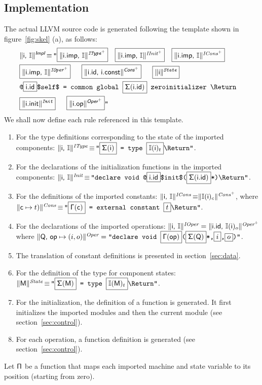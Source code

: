 \documentclass{llncs}
\newcommand{\trad}[2]{\ensuremath{\lVert \textsf{#1} \rVert^{\textit{#2}}}}
\newcommand{\nl}[0]{\text{\Return}}
\DeclareMathOperator{\isdef}{\equiv}
\newcommand{\llvm}[1]{\texttt{#1}}
\newcommand{\B}[1]{\textsf{#1}}
\newcommand{\ListOf}[1]{$\mbox{#1}^+$}
\newcommand{\PH}[1]{\framebox{$#1$}}
\newcommand{\intf}[0]{\ensuremath{\mathbb{I}}}
\newcommand{\Global}[0]{\ensuremath{\sf\Gamma}}
\newcommand{\idx}[0]{\ensuremath{\sf\Pi}}
\newcommand{\state}[0]{\ensuremath{\sf\Sigma}}
\begin{document}
\subsection{Implementation}

The actual LLVM source code is generated following the template shown in
figure~\ref{fig:skel} (a), as follows:
\begin{align*}
  \lefteqn{\trad{\B{i}, \intf}{\B{Impl}} \isdef
  \llvm{"\PH{\trad{\B{i.imp}, \intf}{\ListOf{IType}}}} 
  \quad \PH{\trad{\B{i.imp}, \intf}{\ListOf{IInit}}}
  \quad \PH{\trad{\B{i.imp}, \intf}{\ListOf{ICons}}}} \\
& \llvm{\PH{\trad{\B{i.imp}, \intf}{\ListOf{IOper}}}
  \quad \PH{\trad{\B{i.id}, \B{i.const}}{\ListOf{\B{Cons}}}}
  \quad \PH{\trad{\B{i}}{State}}} \\
& \llvm{@\PH{\B{i.id}}\$self\$ = common global \PH{\state(\B{i.id})} zeroinitializer \nl} \\
& \llvm{\PH{\trad{\B{i.init}}{Init}} 
  \quad \PH{\trad{\B{i.op}}{\ListOf{\B{Oper}}}}"}
\end{align*}
We shall now define each rule referenced in this template.
\begin{enumerate}
\item For the type definitions corresponding to the state of the imported
  components: $\trad{i, \intf}{IType} \isdef \llvm{"\PH{\state(\B{i})} =
    type \PH{\intf(\B{i})_t}\nl"}$.
\item For the declarations of the initialization functions in the imported
  components: $\trad{\B{i}, \intf}{Init} \isdef \llvm{"declare void
    @\PH{\B{i.id}}\$init\$(\PH{\state(\B{i.id})}*)\nl"}$.
\item For the definitions of the imported constants: $\trad{\B{i}, \intf}{ICons}
  \isdef \trad{$\intf(\B{i})_c$}{\ListOf{Cons}}$, where
  \noindent $\trad{$\B{c} \mapsto t)$}{Cons} \isdef \llvm{"\PH{\Global(\B{c})} =
    external constant \PH{t}\nl"}$.
\item For the declarations of the imported operations: $\trad{\B{i},
    \intf}{IOper} = \trad{\B{i.id}, $\intf(\B{i})_o$}{\ListOf{Oper}}$ where
  $\trad{\B{Q}, $\B{op} \mapsto (i, o)$}{Oper} = \llvm{"declare void
    \PH{\Global(\B{op})}(\PH{\state(\B{Q})}*,\PH{i},\PH{o})"}$.
\item The translation of constant definitions is presented in section~\ref{sec:data}.
\item For the definition of the type for component states: \\
\noindent$\trad{\B{M}}{State} \isdef
\llvm{"\PH{\state(\B{M})} = type \PH{\intf(\B{M})_t}\nl"}$.
\item For the initialization, the definition of a function is generated. It
  first initializes the imported modules and then the current module (see
  section~\ref{sec:control}).
\item For each operation, a function definition is generated (see
  section~\ref{sec:control}).
\end{enumerate}
Let $\idx$ be a function that maps each imported machine and state variable to
its position (starting from zero).
\end{document}

